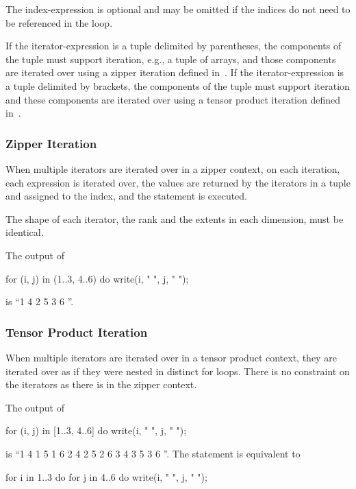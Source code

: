 The index-expression is optional and may be omitted if the indices do
not need to be referenced in the loop.

If the iterator-expression is a tuple delimited by parentheses, the
components of the tuple must support iteration, e.g., a tuple of
arrays, and those components are iterated over using a zipper
iteration defined in~.  If the
iterator-expression is a tuple delimited by brackets, the components
of the tuple must support iteration and these components are iterated
over using a tensor product iteration defined
in~.

\subsubsection{Zipper Iteration}
\label{Zipper_Iteration}

When multiple iterators are iterated over in a zipper context, on each
iteration, each expression is iterated over, the values are returned
by the iterators in a tuple and assigned to the index, and the
statement is executed.

The shape of each iterator, the rank and the extents in each
dimension, must be identical.

\begin{example}
The output of
\begin{chapel}
for (i, j) in (1..3, 4..6) do
  write(i, " ", j, " ");
\end{chapel}
is ``1 4 2 5 3 6 ''.
\end{example}

\subsubsection{Tensor Product Iteration}
\label{Tensor_Product_Iteration}
When multiple iterators are iterated over in a tensor product context,
they are iterated over as if they were nested in distinct for loops.
There is no constraint on the iterators as there is in the zipper
context.

\begin{example}
The output of
\begin{chapel}
for (i, j) in [1..3, 4..6] do
  write(i, " ", j, " ");
\end{chapel}
is ``1 4 1 5 1 6 2 4 2 5 2 6 3 4 3 5 3 6 ''. The statement is
equivalent to
\begin{chapel}
for i in 1..3 do
  for j in 4..6 do
    write(i, " ", j, " ");
\end{chapel}
\end{example}

